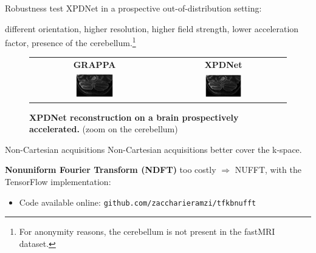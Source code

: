 \begin{frame}{Robustness test}
    XPDNet in a prospective out-of-distribution setting:

    different orientation, higher resolution, higher field strength, lower acceleration factor, presence of the cerebellum.\footnote{For anonymity reasons, the cerebellum is not present in the fastMRI dataset.}

    \begin{figure}[h]
        \begin{center}
        \begin{tabular}{cc}
        \textbf{GRAPPA} & \textbf{XPDNet} \\
        \includegraphics[width=0.30\textwidth]{Figures/clinic_applic/gt_brain_7t_zoom.png}&
        \includegraphics[width=0.30\textwidth]{Figures/clinic_applic/brain_nn_recon_zoom.png}
        \end{tabular}
        \caption{\textbf{XPDNet reconstruction on a brain prospectively accelerated.} (zoom on the cerebellum) \label{fig:brain-7t}}
        \end{center}
    \end{figure}
\end{frame}

\begin{frame}{Non-Cartesian acquisitions}
    Non-Cartesian acquisitions better cover the k-space.
    \pause

    \textbf{Nonuniform Fourier Transform (NDFT)} too costly $\Rightarrow$ NUFFT, with the TensorFlow implementation:
    \begin{itemize}
        \item {} Code available online: \texttt{github.com/zaccharieramzi/tfkbnufft}
    \end{itemize}
\end{frame}

